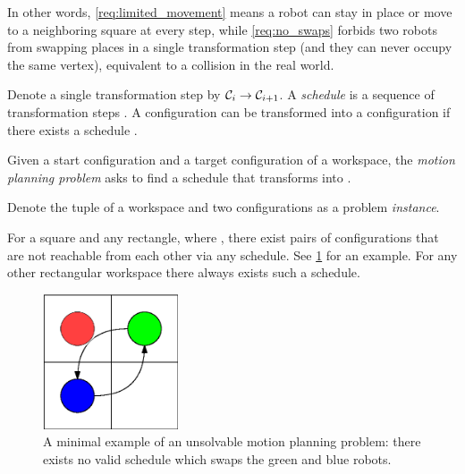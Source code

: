 In other words, \cref{req:limited_movement} means a robot can stay in place or move to a neighboring square at every step, while \cref{req:no_swaps} forbids two robots from swapping places in a single transformation step (and they can never occupy the same vertex), equivalent to a collision in the real world.

Denote a single transformation step by \(\mathcal{C}_{i} \rightarrow \mathcal{C}_{i + 1}\). 
A \emph{schedule} is a sequence of transformation steps . 
A configuration  can be transformed into a configuration  if there exists a schedule .

\begin{definition}\label{def:motion_planning_problem}
	Given a start configuration  and a target configuration  of a workspace, the \emph{motion planning problem} asks to find a schedule that transforms  into .
\end{definition}

Denote the tuple of a workspace and two configurations  as a problem \emph{instance}. 

\begin{remark}\label{remark:reachability}
	For a  square and any  rectangle, where , there exist pairs of configurations that are not reachable from each other via any schedule. 
	See \cref{fig:reachability} for an example. For any other rectangular workspace there always exists such a schedule. 
\end{remark}

\begin{figure}[h]
	\centering
	\includegraphics[width=4cm]{include/impossible_2x2.eps}
	\caption{A minimal example of an unsolvable motion planning problem: there exists no valid schedule which swaps the green and blue robots.}\label{fig:reachability}
\end{figure}

